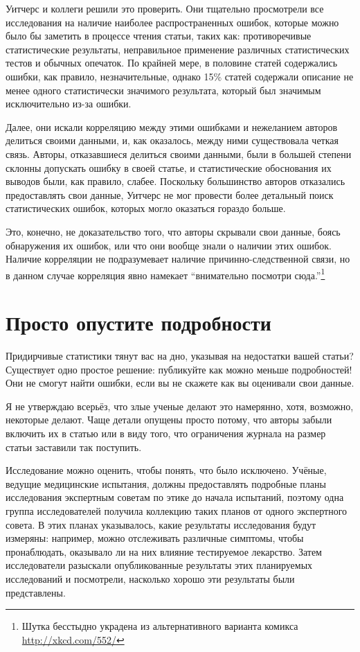 Уитчерс и коллеги решили это проверить. Они тщательно просмотрели все исследования на наличие наиболее распространенных ошибок, которые можно было бы заметить в процессе чтения статьи, таких как: противоречивые статистические результаты, неправильное применение различных статистических тестов и обычных опечаток. По крайней мере, в половине статей содержались ошибки, как правило, незначительные, однако 15\% статей содержали описание не менее одного статистически значимого результата, который был значимым исключительно из-за ошибки. 

Далее, они искали корреляцию между этими ошибками и нежеланием авторов делиться своими данными, и, как оказалось, между ними существовала четкая связь. Авторы, отказавшиеся делиться своими данными, были в большей степени склонны допускать ошибку в своей статье, и статистические обоснования их выводов были, как правило, слабее.\cite{wicherts_willingness_2011} Поскольку большинство авторов отказались предоставлять свои данные, Уитчерс не мог провести более детальный поиск статистических ошибок, которых могло оказаться гораздо больше.

Это, конечно, не доказательство того, что авторы скрывали свои данные, боясь обнаружения их ошибок, или что они вообще знали о наличии этих ошибок. Наличие корреляции не подразумевает наличие причинно-следственной связи, но в данном случае корреляция явно намекает ``внимательно посмотри сюда.''\footnote{Шутка бесстыдно украдена из альтернативного варианта комикса \href{http://xkcd.com/552/}{http://xkcd.com/552/}}



\section{Просто опустите подробности}
\label{chp10:leaveoutdetails}

Придирчивые статистики тянут вас на дно, указывая на недостатки вашей статьи? Существует одно простое решение: публикуйте как можно меньше подробностей! Они не смогут найти ошибки, если вы не скажете как вы оценивали свои данные.

Я не утверждаю всерьёз, что злые ученые делают это намерянно, хотя, возможно, некоторые делают. Чаще детали опущены просто потому, что авторы забыли включить их в статью или в виду того, что ограничения журнала на размер статьи заставили так поступить.

Исследование можно оценить, чтобы понять, что было исключено. Учёные, ведущие медицинские испытания, должны предоставлять подробные планы исследования экспертным советам по этике до начала испытаний, поэтому одна группа исследователей получила коллекцию таких планов от одного  экспертного совета. В этих планах указывалось, какие результаты исследования будут измеряны: например, можно отслеживать различные симптомы, чтобы пронаблюдать, оказывало ли на них влияние тестируемое лекарство. Затем исследователи разыскали опубликованные результаты этих планируемых исследований и посмотрели, насколько хорошо эти результаты были представлены.   


